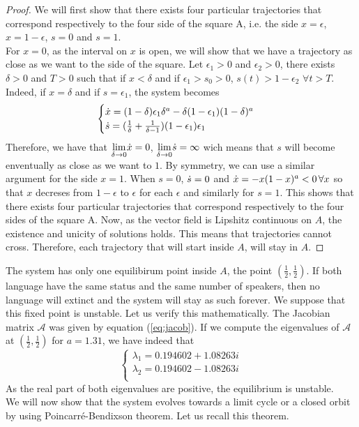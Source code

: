 \documentclass{article}
\begin{document}
\begin{proof}
We will first show that there exists four particular trajectories that correspond respectively to the four side of the square A, i.e. the side $x=\epsilon$, $x=1-\epsilon$, $s=0$ and $s=1$. \\
For $x=0$, as the interval on $x$ is open, we will show that we have a trajectory as close as we want to the side of the square.
Let $\epsilon_1>0$ and $\epsilon_2 >0$, there exists $\delta > 0$ and $T > 0$ such that if $x < \delta$ and  if $\epsilon_1>s_0>0$, $s(t) > 1- \epsilon_2 \, \, \forall t > T$.
Indeed, if $x = \delta$ and  if $s=\epsilon_1$, the system becomes
\[
\begin{cases}
\dot{x} =  (1-\delta)\epsilon_1\delta^a - \delta (1-\epsilon_1) (1-\delta)^a  \\
\dot{s} = (\frac{1}{\delta}+\frac{1}{\delta-1})(1-\epsilon_1)\epsilon_1 \\
\end{cases}
\]
Therefore, we have that $\underset{\delta \rightarrow 0}{\text{lim}} \dot{x} = 0$, $\underset{\delta \rightarrow 0}{\text{lim}} \dot{s} = \infty$ wich means that $s$ will become enventually as close as we want to $1$. By symmetry, we can use a similar argument for the side $x=1$.
When $s=0$, $\dot{s} = 0$ and $\dot{x} = -x(1-x)^a < 0 \, \forall{x}$ so that $x$ decreses from $1-\epsilon$ to $\epsilon$ for each $\epsilon$ and similarly for $s=1$.
This shows that there exists four particular trajectories that correspond respectively to the four sides of the square A.
Now, as the vector field is Lipshitz continuous on $A$, the existence and unicity of solutions holds.
This means that trajectories cannot cross.
Therefore, each trajectory that will start inside $A$, will stay in $A$.
\end{proof}

The system has only one equilibirum point inside $A$, the point $(\frac{1}{2}, \frac{1}{2})$.
If both language have the same status and the same number of speakers, then no language will extinct and the system will stay as such forever.
We suppose that this fixed point is unstable.
Let us verify this mathematically.
The Jacobian matrix $\mathcal{A}$ was given by equation (\ref{eq:jacob}).
If we compute the eigenvalues of $\mathcal{A}$ at $(\frac{1}{2}, \frac{1}{2})$ for $a=1.31$, we have indeed that
\[
\begin{cases}
\lambda_1 = 0.194602+1.08263i \\
\lambda_2 = 0.194602-1.08263i \\
\end{cases}
\]
As the real part of both eigenvalues are positive, the equilibrium is unstable. \\
We will now show that the system evolves towards a limit cycle or a closed orbit by using Poincarré-Bendixson theorem.
Let us recall this theorem. \\
\end{document}
